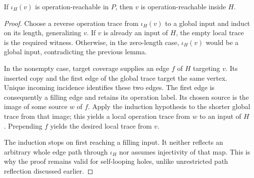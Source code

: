 \begin{theorem}
If $\iota_H(v)$ is operation-reachable in $P$, then $v$ is
operation-reachable inside $H$.
\end{theorem}
\begin{proof}
Choose a reverse operation trace from $\iota_H(v)$ to a global input and
induct on its length, generalizing $v$. If $v$ is already an input of $H$,
the empty local trace is the required witness. Otherwise, in the zero-length
case, $\iota_H(v)$ would be a global input, contradicting the previous lemma.

In the nonempty case, target coverage supplies an edge $f$ of $H$ targeting
$v$. Its inserted copy and the first edge of the global trace target the
same vertex. Unique incoming incidence identifies these two edges. The
first edge is consequently a filling edge and retains its operation label.
Its chosen source is the image of some source $w$ of $f$. Apply the induction
hypothesis to the shorter global trace from that image; this yields a local
operation trace from $w$ to an input of $H$. Prepending $f$ yields the desired
local trace from $v$.

The induction stops on first reaching a filling input. It neither reflects
an arbitrary whole edge path through $\iota_H$ nor assumes injectivity of
that map. This is why the proof remains valid for self-looping holes, unlike
unrestricted path reflection discussed earlier.
\end{proof}

